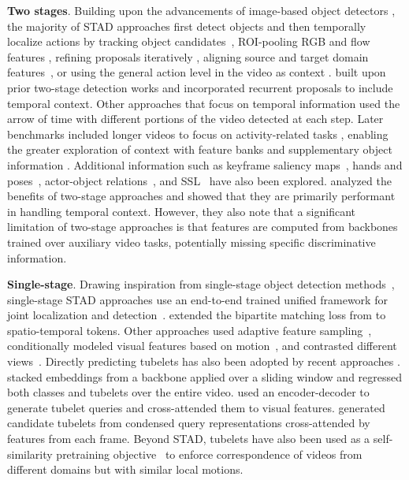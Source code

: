 \noindent
\textbf{Two stages}. Building upon the advancements of image-based object detectors , the majority of STAD approaches first detect objects and then temporally localize actions by tracking object candidates~, ROI-pooling RGB and flow features , refining proposals iteratively , aligning source and target domain features~, or using the general action level in the video as context .  built upon prior two-stage detection works and incorporated recurrent proposals to include temporal context. Other approaches that focus on temporal information  used the arrow of time with different portions of the video detected at each step. Later benchmarks included longer videos to focus on activity-related tasks , enabling the greater exploration of context with feature banks  and supplementary object information . Additional information such as keyframe saliency maps~, hands and poses~, actor-object relations~, and SSL~ have also been explored.  analyzed the benefits of two-stage approaches and showed that they are primarily performant in handling temporal context. However, they also note that a significant limitation of two-stage approaches is that features are computed from backbones trained over auxiliary video tasks, potentially missing specific discriminative information.


\noindent
\textbf{Single-stage}. Drawing inspiration from single-stage object detection methods~, single-stage STAD approaches use an end-to-end trained unified framework for joint localization and detection~.  extended the bipartite matching loss from  to spatio-temporal tokens. Other approaches used adaptive feature sampling~, conditionally modeled visual features based on motion~, and contrasted different views~. Directly predicting tubelets has also been adopted by recent approaches .  stacked embeddings from a backbone applied over a sliding window and regressed both classes and tubelets over the entire video.  used an encoder-decoder to generate tubelet queries and cross-attended them to visual features.  generated candidate tubelets from condensed query representations cross-attended by features from each frame. Beyond STAD, tubelets have also been used as a self-similarity pretraining objective~ to enforce correspondence of videos from different domains but with similar local motions. 


